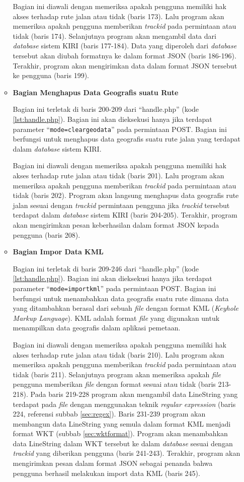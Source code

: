 \documentclass[a4paper,twoside]{article}
\begin{document}
\begin{enumerate}
\begin{itemize}
Bagian ini diawali dengan memeriksa apakah pengguna memiliki hak akses terhadap rute jalan atau tidak (baris 173). Lalu program akan memeriksa apakah pengguna memberikan \textit{trackid} pada permintaan atau tidak (baris 174). Selanjutnya program akan mengambil data dari \textit{database} sistem KIRI (baris 177-184). Data yang diperoleh dari \textit{database} tersebut akan diubah formatnya ke dalam format JSON (baris 186-196). Terakhir, program akan mengirimkan data dalam format JSON tersebut ke pengguna (baris 199).

\item \textbf{Bagian Menghapus Data Geografis suatu Rute}

Bagian ini terletak di baris 200-209 dari ``handle.php'' (kode \ref{lst:handle.php}). Bagian ini akan dieksekusi hanya jika terdapat parameter ``\texttt{mode=cleargeodata}'' pada permintaan POST. Bagian ini berfungsi untuk menghapus data geografis suatu rute jalan yang terdapat dalam \textit{database} sistem KIRI.

Bagian ini diawali dengan memeriksa apakah pengguna memiliki hak akses terhadap rute jalan atau tidak (baris 201). Lalu program akan memeriksa apakah pengguna memberikan \textit{trackid} pada permintaan atau tidak (baris 202). Program akan langsung menghapus data geografis rute jalan sesuai dengan \textit{trackid} permintaan pengguna jika \textit{trackid} tersebut terdapat dalam \textit{database} sistem KIRI (baris 204-205). Terakhir, program akan mengirimkan pesan keberhasilan dalam format JSON kepada pengguna (baris 208).

\item \textbf{Bagian Impor Data KML}

Bagian ini terletak di baris 209-246 dari ``handle.php'' (kode \ref{lst:handle.php}). Bagian ini akan dieksekusi hanya jika terdapat parameter ``\texttt{mode=importkml}'' pada permintaan POST. Bagian ini berfungsi untuk menambahkan data geografis suatu rute dimana data yang ditambahkan berasal dari sebuah \textit{file} dengan format KML (\textit{Keyhole Markup Language}). KML adalah format \textit{file} yang digunakan untuk menampilkan data geografis dalam aplikasi pemetaan\cite{kml}. 

Bagian ini diawali dengan memeriksa apakah pengguna memiliki hak akses terhadap rute jalan atau tidak (baris 210). Lalu program akan memeriksa apakah pengguna memberikan \textit{trackid} pada permintaan atau tidak (baris 211). Selanjutnya program akan memeriksa apakah \textit{file} pengguna memberikan \textit{file} dengan format sesuai atau tidak (baris 213-218). Pada baris 219-228 program akan mengambil data LineString yang terdapat pada \textit{file} dengan menggunakan teknik \textit{regular expression} (baris 224, referensi subbab \ref{sec:regex}). Baris 231-239 program akan membangun data LineString yang semula dalam format KML menjadi format WKT (subbab \ref{sec:wktformat}). Program akan menambahkan data LineString dalam WKT tersebut ke dalam \textit{database} sesuai dengan \textit{trackid} yang diberikan pengguna (baris 241-243). Terakhir, program akan mengirimkan pesan dalam format JSON sebagai penanda bahwa pengguna berhasil melakukan import data KML (baris 245).


\end{itemize}
\end{enumerate}
\end{document}

